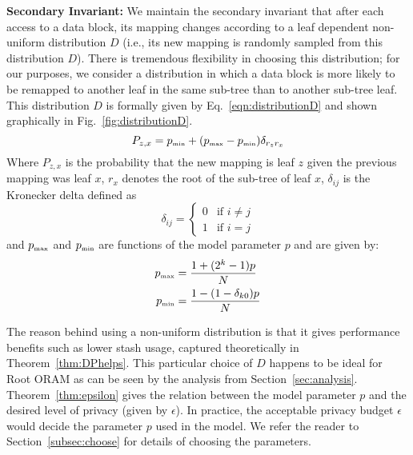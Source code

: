 \documentclass[USenglish,oneside,twocolumn]{article}
\newcommand{\ourprotocol}{Root ORAM}
\begin{document}
\textbf{Secondary Invariant: }We maintain the secondary invariant that after each access to a data block, its mapping changes according to a leaf dependent non-uniform distribution $D$ (i.e., its new mapping is randomly sampled from this distribution $D$). There is tremendous flexibility in choosing this distribution; for our purposes, we consider a distribution in which a data block is more likely to be remapped to another leaf in the same sub-tree than to another sub-tree leaf. This distribution $D$ is formally given by Eq.~\ref{eqn:distributionD} and shown graphically in Fig.~\ref{fig:distributionD}.
\begin{equation}\label{eqn:distributionD}
P_{z,x} = p_{{\tiny \mbox{min}}} + (p_{{\tiny \mbox{max}}} - p_{{\tiny \mbox{min}}}) \delta_{r_z r_x}
\end{equation}
Where $P_{z,x}$ is the probability that the new mapping is leaf $z$ given the previous mapping was leaf $x$, $r_x$ denotes the root of the sub-tree of leaf $x$, $\delta_{ij}$ is the Kronecker delta defined as
\begin{equation*}
\delta_{ij} = 
\begin{cases}
0 	& \text{if $i \neq j$}\\
1	& \text{if $i=j$}
\end{cases}
\end{equation*} and $p_{{\tiny \mbox{max}}}$ and $p_{{\tiny \mbox{min}}}$ are functions of the model parameter $p$ and are given by: 
\begin{equation}\label{eqn:probabs}
\begin{aligned}
p_{{\tiny \mbox{max}}} &= \frac{1+ (2^k - 1)p}{N} \\
p_{{\tiny \mbox{min}}} &= \frac{1- (1-\delta_{k0}) p}{N}
\end{aligned}
\end{equation}

The reason behind using a non-uniform distribution is that it gives performance benefits such as lower stash usage, captured theoretically in Theorem~\ref{thm:DPhelps}. This particular choice of $D$ happens to be ideal for \ourprotocol{} as can be seen by the analysis from Section~\ref{sec:analysis}. Theorem~\ref{thm:epsilon} gives the relation between the model parameter $p$ and the desired level of privacy (given by $\epsilon$). In practice, the acceptable privacy budget $\epsilon$ would decide the parameter $p$ used in the model. We refer the reader to Section~\ref{subsec:choose} for details of choosing the parameters. 
\end{document}
